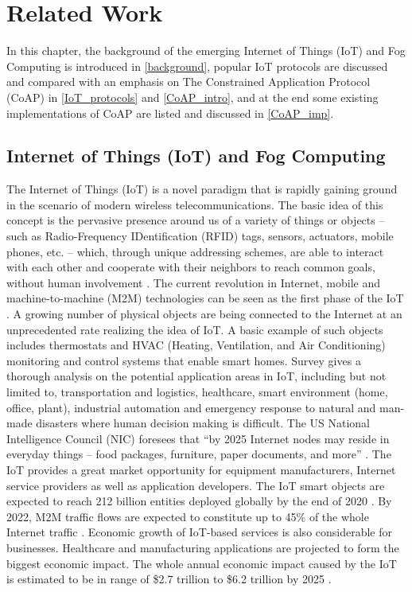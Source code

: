 \chapter{Related Work}\label{ch3}

In this chapter, the background of the emerging Internet of Things (IoT) and Fog Computing is introduced in \autoref{background}, popular IoT protocols are discussed and compared with an emphasis on The Constrained Application Protocol (CoAP) in \autoref{IoT_protocols} and \autoref{CoAP_intro}, and at the end some existing implementations of CoAP are listed and discussed in \autoref{CoAP_imp}.

\section{Internet of Things (IoT) and Fog Computing} \label{background}

The Internet of Things (IoT) is a novel paradigm that is rapidly gaining ground in the scenario of modern wireless telecommunications. The basic idea of this concept is the pervasive presence around us of a variety of things or objects -- such as Radio-Frequency IDentification (RFID) tags, sensors, actuators, mobile phones, etc. -- which, through unique addressing schemes, are able to interact with each other and cooperate with their neighbors to reach common goals, without human involvement \cite{Atzori20102787}. The current revolution in Internet, mobile and machine-to-machine (M2M) technologies can be seen as the first phase of the IoT \cite{7123563}.  A growing number of physical objects are being connected to the Internet at an unprecedented rate realizing the idea of IoT. A basic example of such objects includes thermostats and HVAC (Heating, Ventilation, and Air Conditioning) monitoring and control systems that enable smart homes. Survey \cite{Atzori20102787} gives a thorough analysis on the potential application areas in IoT, including but not limited to, transportation and logistics, healthcare, smart environment (home, office, plant), industrial automation and emergency response to natural and man-made disasters where human decision making is difficult. The US National Intelligence Council (NIC) foresees that ``by 2025 Internet nodes may reside in everyday things -- food packages, furniture, paper documents, and more'' \cite{Atzori20102787}. The IoT provides a great market opportunity for equipment manufacturers, Internet service providers as well as application developers. The IoT smart objects are expected to reach 212 billion entities deployed globally by the end of 2020 \cite{gantz2012digital}. By 2022, M2M traffic flows are expected to constitute up to 45\% of the whole Internet traffic \cite{7123563}. Economic growth of IoT-based services is also considerable for businesses. Healthcare and manufacturing applications are projected to form the biggest economic impact. The whole annual economic impact caused by the IoT is estimated to be in range of \$2.7 trillion to \$6.2 trillion by 2025 \cite{7123563}.

